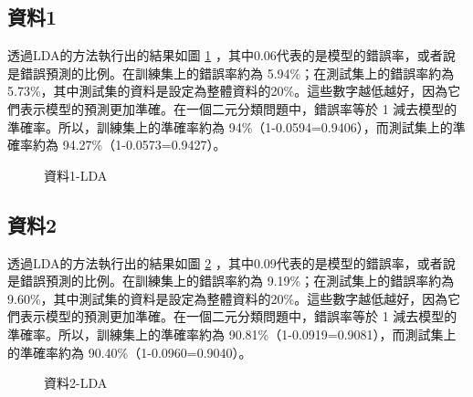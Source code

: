 \documentclass[12pt, a4paper]{article}
\begin{document}
\subsection{資料1}
透過LDA的方法執行出的結果如圖 \ref{fig:la1-LDA} ，其中0.06代表的是模型的錯誤率，或者說是錯誤預測的比例。在訓練集上的錯誤率約為 5.94\%；在測試集上的錯誤率約為 5.73\%，其中測試集的資料是設定為整體資料的20\%。這些數字越低越好，因為它們表示模型的預測更加準確。在一個二元分類問題中，錯誤率等於 1 減去模型的準確率。所以，訓練集上的準確率約為 94\%（1-0.0594=0.9406），而測試集上的準確率約為 94.27\%（1-0.0573=0.9427）。\\
\begin{table} [H]
\centering
    \caption{資料1之LDA錯判率}\label{tb:la1-LDA}
    \renewcommand\arraystretch{1.5}
\end{table}

\begin{figure}[H]
    \caption{資料1-LDA}
    \label{fig:la1-LDA}
\end{figure}

\subsection{資料2}
透過LDA的方法執行出的結果如圖 \ref{fig:la2-LDA} ，其中0.09代表的是模型的錯誤率，或者說是錯誤預測的比例。在訓練集上的錯誤率約為 9.19\%；在測試集上的錯誤率約為 9.60\%，其中測試集的資料是設定為整體資料的20\%。這些數字越低越好，因為它們表示模型的預測更加準確。在一個二元分類問題中，錯誤率等於 1 減去模型的準確率。所以，訓練集上的準確率約為 90.81\%（1-0.0919=0.9081），而測試集上的準確率約為 90.40\%（1-0.0960=0.9040）。\\
\begin{table} [H]
\centering
    \caption{資料2之LDA錯判率}\label{tb:la2-LDA}
    \renewcommand\arraystretch{1.5}
\end{table}
\begin{figure}[H]
    \caption{資料2-LDA}
    \label{fig:la2-LDA}
\end{figure}
\end{document}
